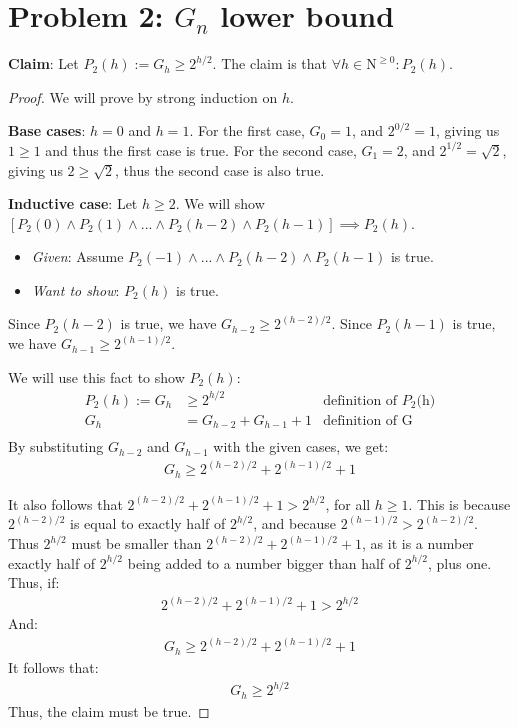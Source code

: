 \documentclass[titlepage]{article}
\begin{document}
\section{Problem 2: $G_n$ lower bound}

\textbf{Claim}: Let $P_2(h) := G_h \geq 2^{h/2}$.  The claim is that $\forall h \in \mathrm{N}^{\geq 0}: P_2(h)$.

\begin{proof}
We will prove by strong induction on $h$.

\textbf{Base cases}: $h=0$ and $h=1$.  For the first case, $G_{0} = 1$, and $2^{0/2} = 1$, giving us $1 \geq 1$ and thus the first case is true. For the second case, $G_1 = 2$, and $2^{1/2} = \sqrt{2}$, giving us $2 \geq \sqrt{2}$, thus the second case is also true. 


\textbf{Inductive case}: Let $h \geq 2$.  We will show $[P_2(0) \land P_2(1) \land ... \land P_2(h-2) \land P_2(h-1)] \implies P_2(h)$.
\begin{itemize}
\item \emph{Given}: Assume $P_2(-1) \land ... \land P_2(h-2) \land P_2(h-1)$ is true.
\item \emph{Want to show}: $P_2(h)$ is true.
\end{itemize}
Since $P_2(h-2)$ is true, we have
$G_{h-2} \geq 2^{(h-2)/2}$.
Since $P_2(h-1)$ is true, we have
$G_{h-1} \geq 2^{(h-1)/2}$.

We will use this fact to show $P_2(h)$:
\begin{align*}
P_2(h) := G_{h} &\geq 2^{h/2} & \text{definition of $P_2$(h)} \\
G_{h} &= G_{h-2} + G_{h-1} + 1 & \text{definition of G} \\
\end{align*}
By substituting $G_{h-2}$ and $G_{h-1}$ with the given cases, we get:\\
\begin{align*}
G_h \geq 2^{(h-2)/2} + 2^{(h-1)/2} + 1
\end{align*}

It also follows that $2^{(h-2)/2} + 2^{(h-1)/2} + 1 > 2^{h/2}$, for all $h \geq 1$. This is because $2^{(h-2)/2}$ is equal to exactly half of $2^{h/2}$, and because $2^{(h-1)/2} > 2^{(h-2)/2}$. Thus $2^{h/2}$ must be smaller than $2^{(h-2)/2} + 2^{(h-1)/2} + 1$, as it is a number exactly half of  $2^{h/2}$ being added to a number bigger than half of $2^{h/2}$, plus one. Thus, if:
\begin{align*}
2^{(h-2)/2} + 2^{(h-1)/2} + 1 > 2^{h/2}
\end{align*}
And:
\begin{align*}
G_h \geq 2^{(h-2)/2} + 2^{(h-1)/2} + 1
\end{align*}
It follows that:
\begin{align*}
G_{h} \geq 2^{h/2}
\end{align*}
Thus, the claim must be true.
\end{proof}
\end{document}
